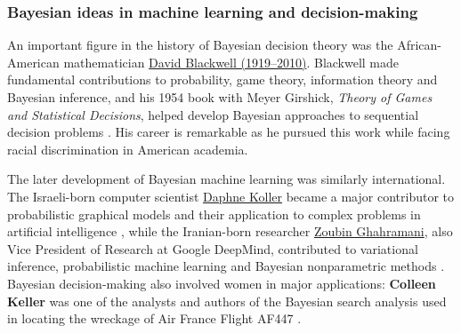 \subsubsection{Bayesian ideas in machine learning and decision-making}

An important figure in the history of Bayesian decision theory was the African-American mathematician \href{https://en.wikipedia.org/wiki/David_Blackwell}{David Blackwell (1919--2010)}. Blackwell made fundamental contributions to probability, game theory, information theory and Bayesian inference, and his 1954 book with Meyer Girshick, \emph{Theory of Games and Statistical Decisions}, helped develop Bayesian approaches to sequential decision problems \cite{blackwellgirshick1954}. His career is remarkable as he pursued this work while facing racial discrimination in American academia. 

The later development of Bayesian machine learning was similarly international. The Israeli-born computer scientist \href{https://en.wikipedia.org/wiki/Daphne_Koller}{Daphne Koller} became a major contributor to probabilistic graphical models and their application to complex problems in artificial intelligence \cite{kollerfriedman2009}, while the Iranian-born researcher \href{https://en.wikipedia.org/wiki/Zoubin_Ghahramani}{Zoubin Ghahramani}, also Vice President of Research at Google DeepMind, contributed to variational inference, probabilistic machine learning and Bayesian nonparametric methods \cite{jordan1999}. Bayesian decision-making also involved women in major applications: \textbf{Colleen Keller} was one of the analysts and authors of the Bayesian search analysis used in locating the wreckage of Air France Flight AF447 \cite{stone2014}.


